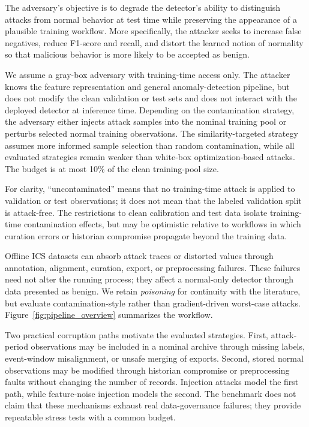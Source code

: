 \documentclass[10pt,conference]{IEEEtran}
\begin{document}
The adversary's objective is to degrade the detector's ability to distinguish attacks from normal behavior at test time while preserving the appearance of a plausible training workflow. More specifically, the attacker seeks to increase false negatives, reduce F1-score and recall, and distort the learned notion of normality so that malicious behavior is more likely to be accepted as benign.

We assume a gray-box adversary with training-time access only. The attacker knows the feature representation and general anomaly-detection pipeline, but does not modify the clean validation or test sets and does not interact with the deployed detector at inference time. Depending on the contamination strategy, the adversary either injects attack samples into the nominal training pool or perturbs selected normal training observations. The similarity-targeted strategy assumes more informed sample selection than random contamination, while all evaluated strategies remain weaker than white-box optimization-based attacks. The budget is at most 10\% of the clean training-pool size.

For clarity, ``uncontaminated'' means that no training-time attack is applied to validation or test observations; it does not mean that the labeled validation split is attack-free. The restrictions to clean calibration and test data isolate training-time contamination effects, but may be optimistic relative to workflows in which curation errors or historian compromise propagate beyond the training data.

Offline ICS datasets can absorb attack traces or distorted values through annotation, alignment, curation, export, or preprocessing failures. These failures need not alter the running process; they affect a normal-only detector through data presented as benign. We retain \textit{poisoning} for continuity with the literature, but evaluate contamination-style rather than gradient-driven worst-case attacks. Figure~\ref{fig:pipeline_overview} summarizes the workflow.

Two practical corruption paths motivate the evaluated strategies. First, attack-period observations may be included in a nominal archive through missing labels, event-window misalignment, or unsafe merging of exports. Second, stored normal observations may be modified through historian compromise or preprocessing faults without changing the number of records. Injection attacks model the first path, while feature-noise injection models the second. The benchmark does not claim that these mechanisms exhaust real data-governance failures; they provide repeatable stress tests with a common budget.
\end{document}
